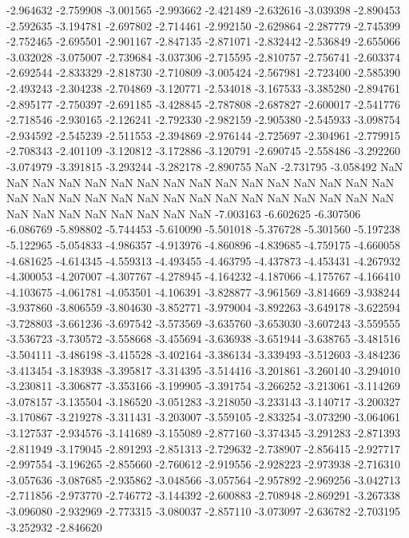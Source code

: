 -2.964632
-2.759908
-3.001565
-2.993662
-2.421489
-2.632616
-3.039398
-2.890453
-2.592635
-3.194781
-2.697802
-2.714461
-2.992150
-2.629864
-2.287779
-2.745399
-2.752465
-2.695501
-2.901167
-2.847135
-2.871071
-2.832442
-2.536849
-2.655066
-3.032028
-3.075007
-2.739684
-3.037306
-2.715595
-2.810757
-2.756741
-2.603374
-2.692544
-2.833329
-2.818730
-2.710809
-3.005424
-2.567981
-2.723400
-2.585390
-2.493243
-2.304238
-2.704869
-3.120771
-2.534018
-3.167533
-3.385280
-2.894761
-2.895177
-2.750397
-2.691185
-3.428845
-2.787808
-2.687827
-2.600017
-2.541776
-2.718546
-2.930165
-2.126241
-2.792330
-2.982159
-2.905380
-2.545933
-3.098754
-2.934592
-2.545239
-2.511553
-2.394869
-2.976144
-2.725697
-2.304961
-2.779915
-2.708343
-2.401109
-3.120812
-3.172886
-3.120791
-2.690745
-2.558486
-3.292260
-3.074979
-3.391815
-3.293244
-3.282178
-2.890755
NaN
-2.731795
-3.058492
NaN
NaN
NaN
NaN
NaN
NaN
NaN
NaN
NaN
NaN
NaN
NaN
NaN
NaN
NaN
NaN
NaN
NaN
NaN
NaN
NaN
NaN
NaN
NaN
NaN
NaN
NaN
NaN
NaN
NaN
NaN
NaN
NaN
NaN
NaN
NaN
NaN
NaN
NaN
-7.003163
-6.602625
-6.307506
-6.086769
-5.898802
-5.744453
-5.610090
-5.501018
-5.376728
-5.301560
-5.197238
-5.122965
-5.054833
-4.986357
-4.913976
-4.860896
-4.839685
-4.759175
-4.660058
-4.681625
-4.614345
-4.559313
-4.493455
-4.463795
-4.437873
-4.453431
-4.267932
-4.300053
-4.207007
-4.307767
-4.278945
-4.164232
-4.187066
-4.175767
-4.166410
-4.103675
-4.061781
-4.053501
-4.106391
-3.828877
-3.961569
-3.814669
-3.938244
-3.937860
-3.806559
-3.804630
-3.852771
-3.979004
-3.892263
-3.649178
-3.622594
-3.728803
-3.661236
-3.697542
-3.573569
-3.635760
-3.653030
-3.607243
-3.559555
-3.536723
-3.730572
-3.558668
-3.455694
-3.636938
-3.651944
-3.638765
-3.481516
-3.504111
-3.486198
-3.415528
-3.402164
-3.386134
-3.339493
-3.512603
-3.484236
-3.413454
-3.183938
-3.395817
-3.314395
-3.514416
-3.201861
-3.260140
-3.294010
-3.230811
-3.306877
-3.353166
-3.199905
-3.391754
-3.266252
-3.213061
-3.114269
-3.078157
-3.135504
-3.186520
-3.051283
-3.218050
-3.233143
-3.140717
-3.200327
-3.170867
-3.219278
-3.311431
-3.203007
-3.559105
-2.833254
-3.073290
-3.064061
-3.127537
-2.934576
-3.141689
-3.155089
-2.877160
-3.374345
-3.291283
-2.871393
-2.811949
-3.179045
-2.891293
-2.851313
-2.729632
-2.738907
-2.856415
-2.927717
-2.997554
-3.196265
-2.855660
-2.760612
-2.919556
-2.928223
-2.973938
-2.716310
-3.057636
-3.087685
-2.935862
-3.048566
-3.057564
-2.957892
-2.969256
-3.042713
-2.711856
-2.973770
-2.746772
-3.144392
-2.600883
-2.708948
-2.869291
-3.267338
-3.096080
-2.932969
-2.773315
-3.080037
-2.857110
-3.073097
-2.636782
-2.703195
-3.252932
-2.846620
